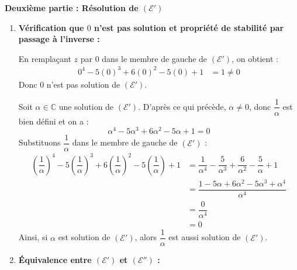 \documentclass[12pt,a4paper]{article}
\begin{document}
\medskip
\textbf{Deuxième partie : Résolution de $(\mathcal{E}')$}

\begin{enumerate}
    \item \textbf{Vérification que $0$ n'est pas solution et propriété de stabilité par passage à l'inverse :}
    
    En remplaçant $z$ par $0$ dans le membre de gauche de $(\mathcal{E}')$, on obtient :
    $$
    \begin{aligned}
        0^4 - 5(0)^3 + 6(0)^2 - 5(0) + 1 &= 1 \neq 0
    \end{aligned}
    $$
    Donc $0$ n'est pas solution de $(\mathcal{E}')$.

    \medskip
    Soit $\alpha \in \mathbb{C}$ une solution de $(\mathcal{E}')$. D'après ce qui précède, $\alpha \neq 0$, donc $\dfrac{1}{\alpha}$ est bien défini et on a :
    $$
    \alpha^4 - 5\alpha^3 + 6\alpha^2 - 5\alpha + 1 = 0
    $$
    Substituons $\dfrac{1}{\alpha}$ dans le membre de gauche de $(\mathcal{E}')$ :
    $$
    \begin{aligned}
        \left(\dfrac{1}{\alpha}\right)^4 - 5\left(\dfrac{1}{\alpha}\right)^3 + 6\left(\dfrac{1}{\alpha}\right)^2 - 5\left(\dfrac{1}{\alpha}\right) + 1 &= \dfrac{1}{\alpha^4} - \dfrac{5}{\alpha^3} + \dfrac{6}{\alpha^2} - \dfrac{5}{\alpha} + 1 \\
        &= \dfrac{1 - 5\alpha + 6\alpha^2 - 5\alpha^3 + \alpha^4}{\alpha^4} \\
        &= \dfrac{0}{\alpha^4} \\
        &= 0
    \end{aligned}
    $$
    Ainsi, si $\alpha$ est solution de $(\mathcal{E}')$, alors $\dfrac{1}{\alpha}$ est aussi solution de $(\mathcal{E}')$.

    \item \textbf{Équivalence entre $(\mathcal{E}')$ et $(\mathcal{E''})$ :}
    

\end{enumerate}
\end{document}
